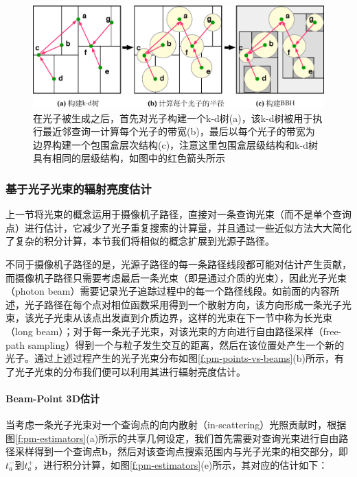 \begin{figure}
	\includegraphics[width=1.0\textwidth]{figures/pm/bbh}
	\caption{在光子被生成之后，首先对光子构建一个k-d树(a)，该k-d树被用于执行最近邻查询一计算每个光子的带宽(b)，最后以每个光子的带宽为边界构建一个包围盒层次结构(c)，注意这里包围盒层级结构和k-d树具有相同的层级结构，如图中的红色箭头所示}
	\label{f:pm-bbh}
\end{figure}



\subsubsection{基于光子光束的辐射亮度估计}
上一节将光束的概念运用于摄像机子路径，直接对一条查询光束（而不是单个查询点）进行估计，它减少了光子重复搜索的计算量，并且通过一些近似方法大大简化了复杂的积分计算，本节我们将相似的概念扩展到光源子路径。

不同于摄像机子路径的是，光源子路径的每一条路径线段都可能对估计产生贡献，而摄像机子路径只需要考虑最后一条光束（即是通过介质的光束），因此光子光束（photon beam）需要记录光子追踪过程中的每一个路径线段。如前面的内容所述，光子路径在每个点对相位函数采用得到一个散射方向，该方向形成一条光子光束，该光子光束从该点出发直到介质边界，这样的光束在下一节中称为长光束（long beam）；对于每一条光子光束，对该光束的方向进行自由路径采样（free-path sampling）得到一个与粒子发生交互的距离，然后在该位置处产生一个新的光子。通过上述过程产生的光子光束分布如图\ref{f:pm-points-vs-beams}(b)所示，有了光子光束的分布我们便可以利用其进行辐射亮度估计。




\paragraph{Beam-Point 3D估计}
当考虑一条光子光束对一个查询点的向内散射（in-scattering）光照贡献时，根据图\ref{f:pm-estimators}(a)所示的共享几何设定，我们首先需要对查询光束进行自由路径采样得到一个查询点$\mathbf{b}$，然后对该查询点搜索范围内与光子光束的相交部分，即$t^{-}_a$到$t^{+}_a$，进行积分计算，如图\ref{f:pm-estimators}(e)所示，其对应的估计如下：

